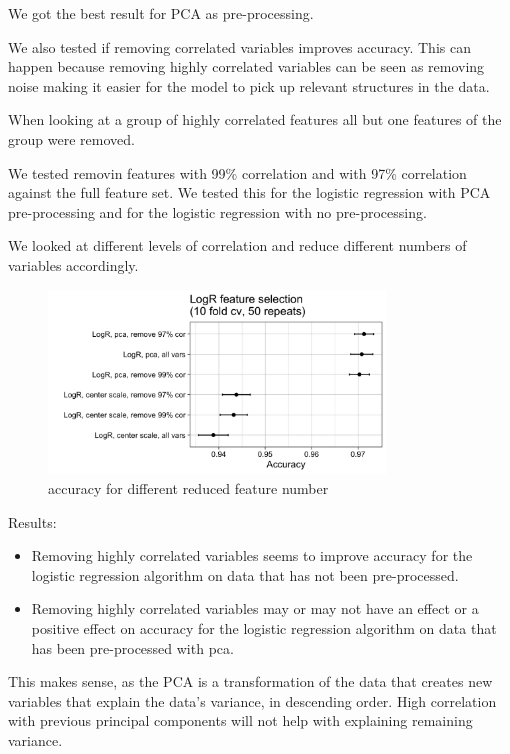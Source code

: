 \documentclass[]{article}
\providecommand{\tightlist}{%
  \setlength{\itemsep}{0pt}\setlength{\parskip}{0pt}}
\begin{document}
We got the best result for PCA as pre-processing.

We also tested if removing correlated variables improves accuracy. This
can happen because removing highly correlated variables can be seen as
removing noise making it easier for the model to pick up relevant
structures in the data.

When looking at a group of highly correlated features all but one
features of the group were removed.

We tested removin features with 99\% correlation and with 97\%
correlation against the full feature set. We tested this for the
logistic regression with PCA pre-processing and for the logistic
regression with no pre-processing.

We looked at different levels of correlation and reduce different
numbers of variables accordingly.

\begin{figure}
    \centering
    \includegraphics[width=0.8\textwidth]{images/feature-selection.png}
    \caption{accuracy for different reduced feature number}
    \label{fig:feature-reduction-options}
\end{figure}

Results:

\begin{itemize}
\tightlist
\item
  Removing highly correlated variables seems to improve accuracy for the
  logistic regression algorithm on data that has not been pre-processed.
\item
  Removing highly correlated variables may or may not have an effect or
  a positive effect on accuracy for the logistic regression algorithm on
  data that has been pre-processed with pca.
\end{itemize}

This makes sense, as the PCA is a transformation of the data that
creates new variables that explain the data's variance, in descending
order. High correlation with previous principal components will not help
with explaining remaining variance.
\end{document}
